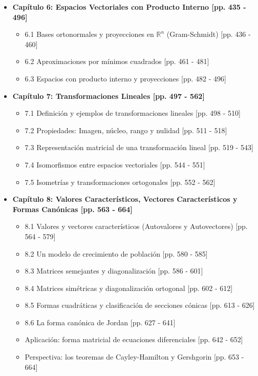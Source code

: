 \documentclass[11pt,a4paper]{article}
\begin{document}
\begin{itemize}
    \item \textbf{Capítulo 6: Espacios Vectoriales con Producto Interno [pp. 435 - 496]}
    \begin{itemize}
        \item 6.1 Bases ortonormales y proyecciones en $\mathbb{R}^n$ (Gram-Schmidt) [pp. 436 - 460]
        \item 6.2 Aproximaciones por mínimos cuadrados [pp. 461 - 481]
        \item 6.3 Espacios con producto interno y proyecciones [pp. 482 - 496]
    \end{itemize}

    \item \textbf{Capítulo 7: Transformaciones Lineales [pp. 497 - 562]}
    \begin{itemize}
        \item 7.1 Definición y ejemplos de transformaciones lineales [pp. 498 - 510]
        \item 7.2 Propiedades: Imagen, núcleo, rango y nulidad [pp. 511 - 518]
        \item 7.3 Representación matricial de una transformación lineal [pp. 519 - 543]
        \item 7.4 Isomorfismos entre espacios vectoriales [pp. 544 - 551]
        \item 7.5 Isometrías y transformaciones ortogonales [pp. 552 - 562]
    \end{itemize}

    \item \textbf{Capítulo 8: Valores Característicos, Vectores Característicos y Formas Canónicas [pp. 563 - 664]}
    \begin{itemize}
        \item 8.1 Valores y vectores característicos (Autovalores y Autovectores) [pp. 564 - 579]
        \item 8.2 Un modelo de crecimiento de población [pp. 580 - 585]
        \item 8.3 Matrices semejantes y diagonalización [pp. 586 - 601]
        \item 8.4 Matrices simétricas y diagonalización ortogonal [pp. 602 - 612]
        \item 8.5 Formas cuadráticas y clasificación de secciones cónicas [pp. 613 - 626]
        \item 8.6 La forma canónica de Jordan [pp. 627 - 641]
        \item Aplicación: forma matricial de ecuaciones diferenciales [pp. 642 - 652]
        \item Perspectiva: los teoremas de Cayley-Hamilton y Gershgorin [pp. 653 - 664]
    \end{itemize}


\end{itemize}
\end{document}
